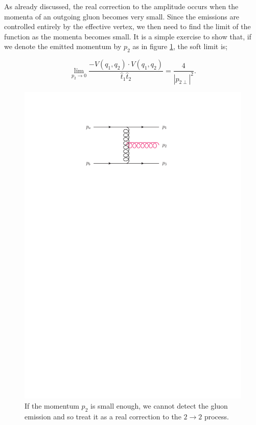 As already discussed, the real correction to the amplitude occurs when the momenta of an outgoing gluon becomes very small. Since the emissions are controlled entirely by the effective vertex, we then need to find the limit of the function as the momenta becomes small. It is a simple exercise to show that, if we denote the emitted momentum by $p_2$ as in figure \ref{fig:realcorrection}, the soft limit is;

\begin{equation}
\lim_{p_2 \to 0} \frac{-V(q_1, q_2) \cdot V(q_1,q_2)}{\hat{t}_1 \hat{t}_2} = \frac{4}{|p_{2 \perp}|^2}.
\end{equation}

\begin{figure}[t]
\centering
\includegraphics[scale=1]{Images/real_correction.pdf} 
\caption{If the momentum $p_2$ is small enough, we cannot detect the gluon emission and so treat it as a real correction to the $2 \to 2$ process.}
\label{fig:realcorrection}
\end{figure}

